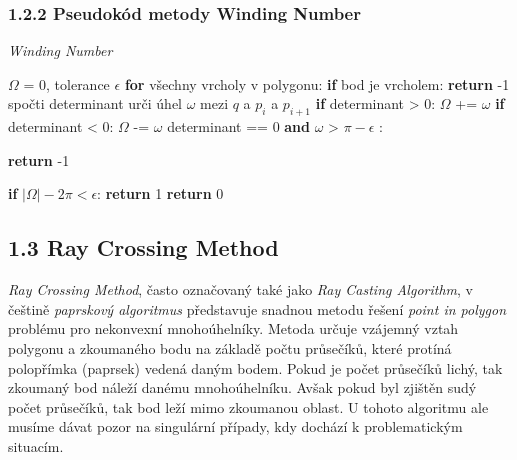 \subsubsection*{1.2.2 Pseudokód metody Winding Number}
\begin{algorithm}[H] 
    \caption {\textit{Winding Number}}
    \begin{algorithmic}[1]
        \State  $\varOmega$ = 0, tolerance $\epsilon$       
        \State \textbf{for} všechny vrcholy v polygonu:
        \State \indent \textbf{if} bod je vrcholem:
         \State \indent\indent \textbf{return} -1    
        \State \indent spočti determinant        
        \State \indent urči úhel $\omega$ mezi $q$ a $p_i$ a $p_{i+1}$
        \State \indent \textbf{if} determinant > 0:
        \State \indent  \indent $\varOmega$ += $\omega$       
        \State \indent \textbf{if} determinant < 0:
        \State \indent \indent $\varOmega$ -= $\omega$             
        \State {} determinant == 0 {\textbf{and}} $\omega$ > $\pi - \epsilon$ :

        \State \indent\indent \textbf{return} -1 
        
        \State \textbf{if} $|\varOmega| - 2\pi < \epsilon$:
        \State \indent\textbf{return} 1
        \State   \textbf{return} 0
    \end{algorithmic}
\end{algorithm}

\subsection*{1.3 Ray Crossing Method}

\textit{Ray Crossing Method}, často označovaný také jako \textit{Ray Casting Algorithm}, v češtině \textit{paprskový algoritmus} představuje snadnou metodu řešení \textit{point in polygon} problému pro nekonvexní mnohoúhelníky. Metoda určuje vzájemný vztah polygonu a zkoumaného bodu na základě počtu průsečíků, které protíná polopřímka (paprsek) vedená daným bodem. Pokud je počet průsečíků lichý, tak zkoumaný bod náleží danému mnohoúhelníku. Avšak pokud byl zjištěn sudý počet průsečíků, tak bod leží mimo zkoumanou oblast. U tohoto algoritmu ale musíme dávat pozor na singulární případy, kdy dochází k problematickým situacím.

